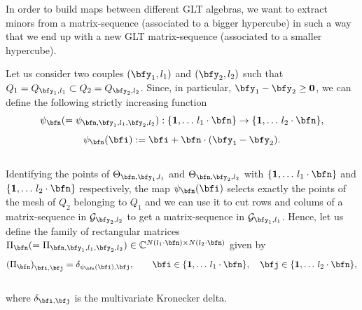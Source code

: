 \documentclass{amsart}
\begin{document}
 In order to build maps between different GLT algebras, we want to extract minors from a matrix-sequence (associated to a bigger hypercube) in such a way that we end up with a new GLT matrix-sequence (associated to a smaller hypercube).
 
 Let us consider two couples $(\bfy_1,l_1)$ and $(\bfy_2,l_2)$ such that $Q_1=Q_{{\bfy_1},l_1}\subset Q_2=Q_{{\bfy_2},l_2}$. Since, in particular, $\bfy_1-\bfy_2\geq\bf0$, we can define the following strictly increasing function\\
\begin{equation*}
	\psi_{\bfn}(=\psi_{{\bfn, \bfy_1},l_1,{\bfy_2},l_2}):\{{\bf1},\ldots\,l_1\cdot\bfn\}\to\{{\bf1},\ldots\,l_2\cdot\bfn\},
\end{equation*}
\begin{equation*}
	\psi_{\bfn}(\bfi):=\bfi+\bfn\cdot(\bfy_1-\bfy_2).
\end{equation*}\\
Identifying the points of $\Theta_{\bfn,\bfy_1,l_1}$ and $\Theta_{\bfn,\bfy_2,l_2}$ with $\{{\bf1},\ldots\,l_1\cdot\bfn\}$ and $\{{\bf1},\ldots\,l_2\cdot\bfn\}$ respectively, the map $\psi_{\bfn}(\bfi)$ selects exactly the points of the mesh of $Q_2$ belonging to $Q_1$ and we can use it to cut rows and colums of a matrix-sequence in $\mathcal{G}_{{\bfy_2},l_2}$ to get a matrix-sequence in $\mathcal{G}_{{\bfy_1},l_1}$. Hence, let us define the family of rectangular matrices $\Pi_{\bfn}(=\Pi_{{\bfn, \bfy_1},l_1,{\bfy_2},l_2})\in\mathbb{C}^{N(l_1\cdot\bfn)\times N(l_2\cdot\bfn)}$ given by\\
\begin{equation*}
	\left(\Pi_{\bfn}\right)_{\bfi,\bfj}=\delta_{\psi_{\bfn}(\bfi),\bfj},\qquad\bfi\in\{{\bf1},\ldots\,l_1\cdot\bfn\},\quad\bfj\in\{{\bf1},\ldots\,l_2\cdot\bfn\},
\end{equation*}\\
where $\delta_{\bfi,\bfj}$ is the multivariate Kronecker delta. 
\end{document}
